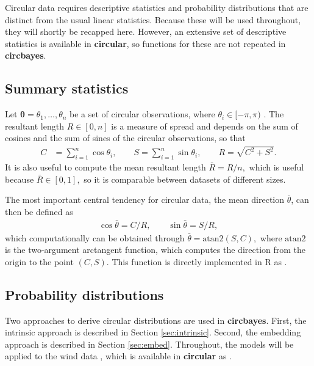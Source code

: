 \documentclass{article}
\newcommand{\code}[1]{\texttt{\detokenize{#1}}}
\let\proglang=\textsf
\newcommand{\pkg}[1]{\textbf{#1}}
\begin{document}
\label{circstats}

Circular data requires descriptive statistics and probability
distributions that are distinct from the usual linear statistics.
Because these will be used throughout, they will shortly be recapped
here. However, an extensive set of descriptive statistics is available
in \pkg{circular}, so functions for these are not repeated in
\pkg{circbayes}.

\hypertarget{summary-statistics}{%
	\subsection{Summary statistics}\label{summary-statistics}}

Let \(\boldsymbol{\theta}= \theta_1, \dots, \theta_n\) be a set of
circular observations, where \(\theta_i \in [-\pi, \pi)\) . The
resultant length \(R\in[0, n]\) is a measure of spread and depends on
the sum of cosines and the sum of sines of the circular observations, so
that \begin{align}
C &= \sum_{i=1}^n\cos \theta_i, \qquad
S = \sum_{i=1}^n\sin \theta_i, \qquad
R = \sqrt{C^2 + S^2}.
\end{align} It is also useful to compute the mean resultant length
\(\bar{R} = R/n,\) which is useful because \(\bar{R} \in [0, 1],\) so it
is comparable between datasets of different sizes.

The most important central tendency for circular data, the mean
direction \(\bar\theta\), can then be defined as \begin{align}
\cos \bar \theta = C/R, \qquad
\sin \bar \theta = S/R,
\end{align} which computationally can be obtained through
\(\bar \theta = \text{atan2}(S, C),\) where \(\text{atan2}\) is the
two-argument arctangent function, which computes the direction from the
origin to the point \((C, S)\). This function is directly implemented in
\proglang{R} as \code{atan2}.

\hypertarget{probability-distributions}{%
	\subsection{Probability distributions}\label{probability-distributions}}

\label{sec:probdist} Two approaches to derive circular distributions are
used in \pkg{circbayes}. First, the intrinsic approach is described in
Section \ref{sec:intrinsic}. Second, the embedding approach is described
in Section \ref{sec:embed}. Throughout, the models will be applied to
the wind data \citep{agostinelli2007robust, fisher1995statistical},
which is available in \pkg{circular} as \code{circular::wind}.
\end{document}
